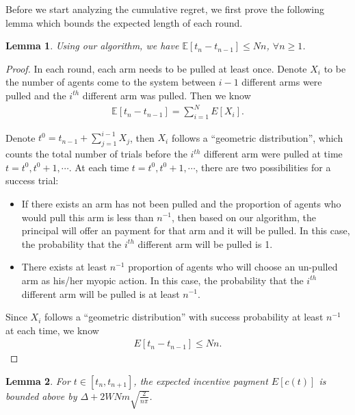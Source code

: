 \documentclass{article}
\newtheorem{lemma}{Lemma}
\begin{document}
Before we start analyzing the cumulative regret, we first prove the following lemma which bounds the expected length of each round.

\begin{lemma}
Using our algorithm, we have $\mathbb{E}[t_{n}-t_{n-1}]\leq Nn$, $\forall n\geq 1$.
\label{round:length}
\end{lemma}


\begin{proof}
In each round, each arm needs to be pulled at least once. Denote $X_{i}$ to be the number of agents come to the system between $i-1$ different arms were pulled and the $i^{th}$ different arm was pulled. Then we know 
\begin{align}
\mathbb{E}[t_{n}-t_{n-1}]=\sum_{i=1}^{N}E[X_{i}]. \nonumber
\end{align}


Denote $t^{0}=t_{n-1}+\sum_{j=1}^{i-1}X_{j}$, then $X_{i}$ follows a ``geometric distribution'', which counts the total number of trials before the $i^{th}$ different arm were pulled at time $t=t^{0},t^{0}+1,\cdots$. At each time $t=t^{0}, t^{0}+1,\cdots$, there are two possibilities for a success trial:
\begin{itemize}
\item If there exists an arm has not been pulled and the proportion of agents who would pull this arm is less than $n^{-1}$, then based on our algorithm, the principal will offer an payment for that arm and it will be pulled. In this case, the probability that the $i^{th}$ different arm will be pulled is 1.  
\item There exists at least $n^{-1}$ proportion of agents who will choose an un-pulled arm as his/her myopic action. In this case, the probability that the $i^{th}$ different arm will be pulled is at least $n^{-1}$.
\end{itemize}

Since $X_{i}$ follows a ``geometric distribution'' with success probability at least $n^{-1}$ at each time, we know 
\begin{align}
E[t_{n}-t_{n-1}]\leq Nn. \nonumber
\end{align}
\end{proof}

\begin{lemma}
For $t\in[t_n,t_{n+1}]$, the expected incentive payment $E[c(t)]$ is bounded above by $\Delta + 2WNm \sqrt{\frac{2}{n\pi}}$. 
\label{lemma:payment}
\end{lemma}
\end{document}
